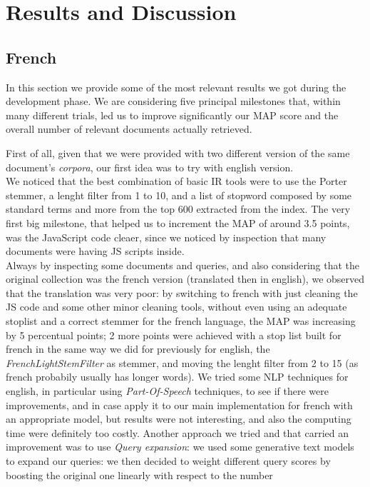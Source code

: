 \pagebreak
\section{Results and Discussion}
\subsection{French}
\label{sec:results}

In this section we provide some of the most relevant results we got during the development phase.
We are considering five principal milestones that, within many different trials, led us to improve significantly our MAP score and the overall number of relevant documents actually retrieved.



First of all, given that we were provided with two different version of the same document's \textit{corpora}, our first idea was to try with english version.\\ 
We noticed that the best combination of basic IR tools were to use the Porter stemmer, a lenght filter from 1 to 10, and a list of stopword composed by some standard terms and more from the top 600 extracted from the index.
The very first big milestone, that helped us to increment the MAP of around 3.5 points, was the JavaScript code cleaer, since we noticed by inspection that many documents were having JS scripts inside.\\
Always by inspecting some documents and queries, and also considering that the original collection was the french version (translated then in english), we observed that the translation was very poor: by switching to french
with just cleaning the JS code and some other minor cleaning tools, without even using an adequate stoplist and a correct stemmer for the french language, the MAP was increasing by 5 percentual points; 2 more points were achieved with
a stop list built for french in the same way we did for previously for english, the \textit{FrenchLightStemFilter} as stemmer, and moving the lenght filter from 2 to 15 (as french probabily usually has longer words).
We tried some NLP techniques for english, in particular using \textit{Part-Of-Speech} techniques, to see if there were improvements, and in case apply it to our main implementation for french with an appropriate model, but results 
were not interesting, and also the computing time were definitely too costly.
Another approach we tried and that carried an improvement was to use \textit{Query expansion}: we used some generative text models to expand our queries: we then decided to weight different query scores by boosting the original one linearly with respect to the number
